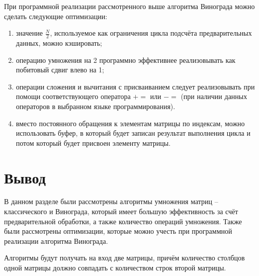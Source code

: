 При программной реализации рассмотренного выше алгоритма Винограда можно сделать 
следующие оптимизации:
\begin{enumerate}
	\item значение $\frac{N}{2}$, используемое как ограничения цикла подсчёта предварительных
        данных, можно кэшировать;
	\item операцию умножения на 2 программно эффективнее реализовывать как побитовый сдвиг 
        влево на 1;
	\item операции сложения и вычитания с присваиванием следует реализовывать при помощи 
        соответствующего оператора $+=$ или $-=$ (при наличии данных операторов в выбранном 
        языке программирования).
    \item вместо постоянного обращения к элементам матрицы по индексам, можно использовать буфер, 
        в который будет записан результат выполнения цикла и потом который будет присвоен
        элементу матрицы.
\end{enumerate}

\section*{Вывод}
В данном разделе были рассмотрены алгоритмы умножения матриц – классического и Винограда, 
который имеет большую эффективность за счёт предварительной обработки, а также количество операций умножения. 
Также были рассмотрены оптимизации, которые можно учесть при программной реализации 
алгоритма Винограда.

Алгоритмы будут получать на вход две матрицы, причём количество столбцов одной матрицы 
должно совпадать с количеством строк второй матрицы. 

\clearpage